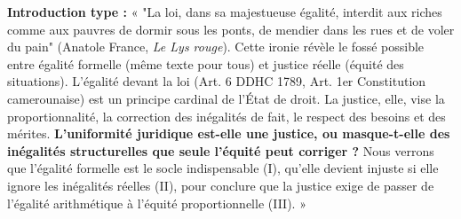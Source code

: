 \documentclass[11pt]{article}
\newcommand{\cle}[1]{{\popxbold\color{popdark}#1}}
\begin{document}
\begin{corrige}
\textbf{Introduction type :} « "La loi, dans sa majestueuse égalité, interdit aux riches comme aux pauvres de dormir sous les ponts, de mendier dans les rues et de voler du pain" (Anatole France, \emph{Le Lys rouge}). Cette ironie révèle le fossé possible entre \cle{égalité formelle} (même texte pour tous) et \cle{justice réelle} (équité des situations). L'égalité devant la loi (Art. 6 DDHC 1789, Art. 1er Constitution camerounaise) est un principe cardinal de l'État de droit. La justice, elle, vise la proportionnalité, la correction des inégalités de fait, le respect des besoins et des mérites. \textbf{L'uniformité juridique est-elle une justice, ou masque-t-elle des inégalités structurelles que seule l'équité peut corriger ?} Nous verrons que l'égalité formelle est le socle indispensable (I), qu'elle devient injuste si elle ignore les inégalités réelles (II), pour conclure que la justice exige de passer de l'égalité arithmétique à l'équité proportionnelle (III). »


\end{corrige}
\end{document}
